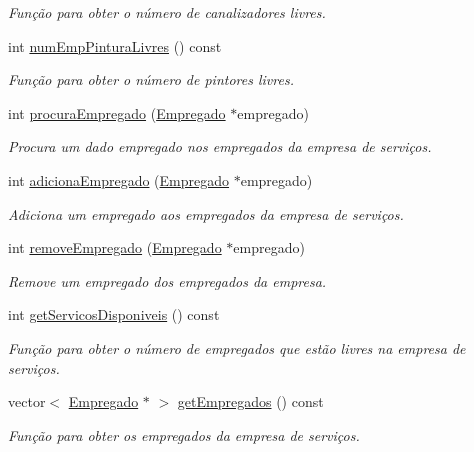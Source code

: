 \begin{DoxyCompactItemize}
\begin{DoxyCompactList}\small\item\em Função para obter o número de canalizadores livres. \end{DoxyCompactList}\item 
int \hyperlink{class_servico_a83583e1dca00f51715e03a1f33818494}{num\+Emp\+Pintura\+Livres} () const 
\begin{DoxyCompactList}\small\item\em Função para obter o número de pintores livres. \end{DoxyCompactList}\item 
int \hyperlink{class_servico_afe9dc57bcaa1f3ea20963d5e46b3c194}{procura\+Empregado} (\hyperlink{class_empregado}{Empregado} $\ast$empregado)
\begin{DoxyCompactList}\small\item\em Procura um dado empregado nos empregados da empresa de serviços. \end{DoxyCompactList}\item 
int \hyperlink{class_servico_a6e3eb546bad5975cf8e678ae4e6f6ea3}{adiciona\+Empregado} (\hyperlink{class_empregado}{Empregado} $\ast$empregado)
\begin{DoxyCompactList}\small\item\em Adiciona um empregado aos empregados da empresa de serviços. \end{DoxyCompactList}\item 
int \hyperlink{class_servico_af2d0e60b4f9b4c1a3e9c545d00a87659}{remove\+Empregado} (\hyperlink{class_empregado}{Empregado} $\ast$empregado)
\begin{DoxyCompactList}\small\item\em Remove um empregado dos empregados da empresa. \end{DoxyCompactList}\item 
int \hyperlink{class_servico_a1a9fbbe6413835ba366355cc4131c413}{get\+Servicos\+Disponiveis} () const 
\begin{DoxyCompactList}\small\item\em Função para obter o número de empregados que estão livres na empresa de serviços. \end{DoxyCompactList}\item 
vector$<$ \hyperlink{class_empregado}{Empregado} $\ast$ $>$ \hyperlink{class_servico_a9d7003d0cc174b05ee16b329d4c96b44}{get\+Empregados} () const 
\begin{DoxyCompactList}\small\item\em Função para obter os empregados da empresa de serviços. \end{DoxyCompactList}\item 

\end{DoxyCompactItemize}
